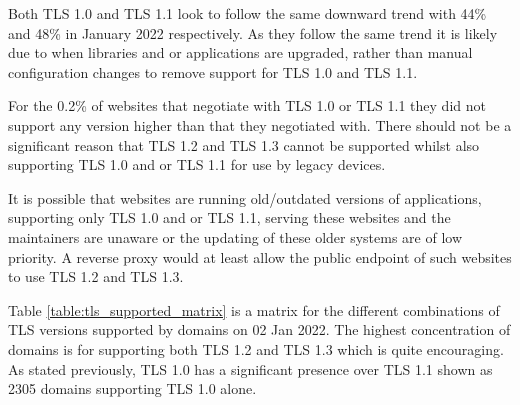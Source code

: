 \documentclass{mscreport}
\begin{document}
\vspace{0.3cm} \noindent
Both TLS 1.0 and TLS 1.1 look to follow the same downward trend with 44\% and 48\% in January 2022 respectively. As they follow the same trend it is likely due to when libraries and or applications are upgraded, rather than manual configuration changes to remove support for TLS 1.0 and TLS 1.1.

\vspace{0.3cm} \noindent
For the 0.2\% of websites that negotiate with TLS 1.0 or TLS 1.1 they did not support any version higher than that they negotiated with. There should not be a significant reason that TLS 1.2 and TLS 1.3 cannot be supported whilst also supporting TLS 1.0 and or TLS 1.1 for use by legacy devices. 

\vspace{0.3cm} \noindent
It is possible that websites are running old/outdated versions of applications, supporting only TLS 1.0 and or TLS 1.1, serving these websites and the maintainers are unaware or the updating of these older systems are of low priority. A reverse proxy would at least allow the public endpoint of such websites to use TLS 1.2 and TLS 1.3.

\vspace{0.3cm} \noindent
Table \ref{table:tls_supported_matrix} is a matrix for the different combinations of TLS versions supported by domains on 02 Jan 2022. The highest concentration of domains is for supporting both TLS 1.2 and TLS 1.3 which is quite encouraging. As stated previously, TLS 1.0 has a significant presence over TLS 1.1 shown as 2305 domains supporting TLS 1.0 alone.
\end{document}
